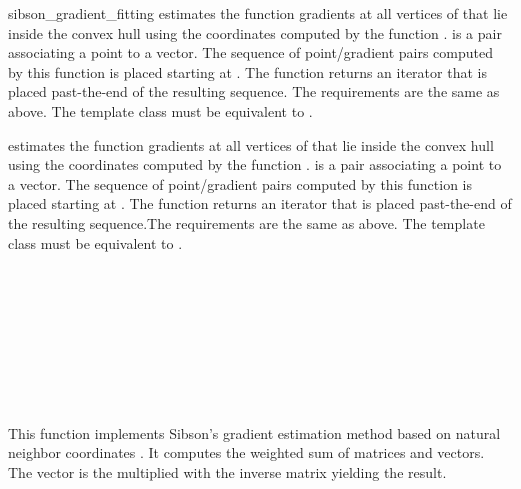 \begin{ccRefFunction}{sibson_gradient_fitting}
{estimates the function gradients at all vertices of  that lie
  inside the convex hull using the coordinates computed by the
  function .
   is a pair associating a point to a
  vector. The sequence of point/gradient pairs computed by this
  function is placed starting at . The function returns an
  iterator that is placed past-the-end of the resulting sequence. The
  requirements are the same as above. The template class  must
  be equivalent to .}

{estimates the function gradients at all vertices of  that lie
  inside the convex hull using the coordinates computed by the
  function .
   is a pair associating a point to a
  vector. The sequence of point/gradient pairs computed by this
  function is placed starting at . The function returns an
  iterator that is placed past-the-end of the resulting sequence.The
  requirements are the same as above. The template class  must
  be equivalent to .}


\ccSeeAlso
{} \\
 \\
 \\
 \\
 \\
\\
 \\
\\

\ccImplementation This function implements Sibson's gradient
estimation method based on natural neighbor coordinates
\cite{s-bdnni-81}. It computes the weighted sum of matrices and
vectors. The vector is the multiplied with the inverse matrix yielding
the result.


\end{ccRefFunction}


